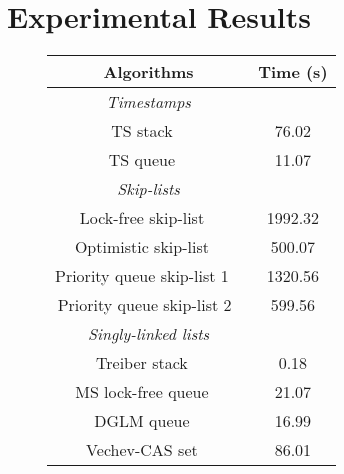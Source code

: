\section{Experimental Results}
\label{section:experiments}
\newcommand{\emm}{(emm)}
\begin{figure}[]
\center



\begin{tabular}{|c | c | }
  \hline
   \textsf{{\textbf{Algorithms}}} &  \textsf{{\textbf{Time (s)}}} \\
\hline
\textsf{{\textit{Timestamps}}} & \\
\hline
\textsf{TS stack  ~\cite{MS:QueueAlgorithms}}\;\;\;\;\;\;  & \textsf{76.02} \\
\textsf{TS queue  ~\cite{MS:QueueAlgorithms}}& \textsf{11.07} \\
\hline
 \textsf{{\textit{Skip-lists}}} &   \\
\hline
\;\;\;\;\textsf{Lock-free skip-list   ~\cite{ArtOfMpP}}\;\;\;\;\;\;  & \textsf{1992.32} \\

\textsf{Optimistic skip-list ~\cite{MS:QueueAlgorithms}}& \textsf{500.07} \\
 
\textsf{Priority queue skip-list 1 ~\cite{Shavit:ElimQueue}}  &  \textsf{1320.56} \\

\textsf{Priority queue skip-list 2~\cite{Shavit:ElimQueue}}  &  \textsf{599.56} \\
\hline
   \textsf{{\textit{Singly-linked lists}}} &   \\
\hline
\textsf{Treiber stack  ~\cite{Treiber:stack}}\;\;\;\;\;\; & \textsf {0.18} \\

\textsf{MS lock-free queue  ~\cite{MS:QueueAlgorithms}}& \textsf{21.07} \\

\textsf{DGLM queue  ~\cite{Doherty:lockfree}}&  \textsf {16.99} \\

\textsf{Vechev-CAS set  ~\cite{Vechev:list}}  & \textsf{86.01} \\


\end{tabular}
\end{figure}
